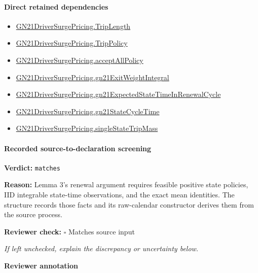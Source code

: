 \documentclass[10pt]{article}
\newcommand{\reviewerbox}{%
  \par\noindent\fbox{\parbox{0.96\linewidth}{\rule{0pt}{0.38in}}}\par
}
\newcommand{\reviewmatch}[1]{%
  \par\noindent\textbf{Reviewer check:} $\square$\; #1\par
  \noindent\emph{If left unchecked, explain the discrepancy or uncertainty below.}\par
}
\begin{document}
\paragraph{Direct retained dependencies}
\begin{itemize}\raggedright
\item \hyperlink{governing-declaration-a616c143f22cf2bc}{GN21\allowbreak{}Driver\allowbreak{}Surge\allowbreak{}Pricing.\allowbreak{}Trip\allowbreak{}Length}
\item \hyperlink{governing-declaration-4312ad4cb899871f}{GN21\allowbreak{}Driver\allowbreak{}Surge\allowbreak{}Pricing.\allowbreak{}Trip\allowbreak{}Policy}
\item \hyperlink{governing-declaration-e94c9281d4f4b12d}{GN21\allowbreak{}Driver\allowbreak{}Surge\allowbreak{}Pricing.\allowbreak{}accept\allowbreak{}All\allowbreak{}Policy}
\item \hyperlink{governing-declaration-14f0a8679c69b067}{GN21\allowbreak{}Driver\allowbreak{}Surge\allowbreak{}Pricing.\allowbreak{}gn21\allowbreak{}Exit\allowbreak{}Weight\allowbreak{}Integral}
\item \hyperlink{governing-declaration-a2f3851e21861428}{GN21\allowbreak{}Driver\allowbreak{}Surge\allowbreak{}Pricing.\allowbreak{}gn21\allowbreak{}Expected\allowbreak{}State\allowbreak{}Time\allowbreak{}In\allowbreak{}Renewal\allowbreak{}Cycle}
\item \hyperlink{governing-declaration-fcede996866d407d}{GN21\allowbreak{}Driver\allowbreak{}Surge\allowbreak{}Pricing.\allowbreak{}gn21\allowbreak{}State\allowbreak{}Cycle\allowbreak{}Time}
\item \hyperlink{governing-declaration-1c88cf5996e161d3}{GN21\allowbreak{}Driver\allowbreak{}Surge\allowbreak{}Pricing.\allowbreak{}single\allowbreak{}State\allowbreak{}Trip\allowbreak{}Mass}
\end{itemize}
\paragraph{Recorded source-to-declaration screening}
\textbf{Verdict:} \texttt{matches}
\\
{\raggedright
\textbf{Reason:} Lemma 3's renewal argument requires feasible positive state policies, IID integrable state-\allowbreak{}time observations, and the exact mean identities.\allowbreak{} The structure records those facts and its raw-\allowbreak{}calendar constructor derives them from the source process.\allowbreak{}
\par}
\reviewmatch{Matches source input}
\noindent\textbf{Reviewer annotation}\par
\reviewerbox
\clearpage
\hypertarget{paper-prerequisite-470400593141b2a3}{}
\end{document}

